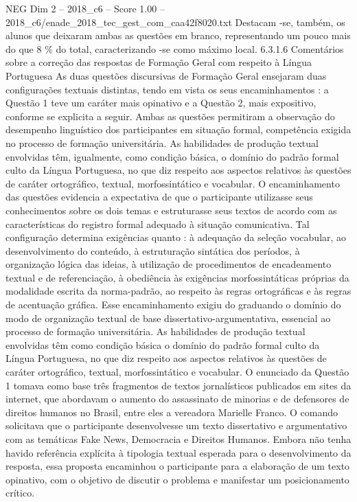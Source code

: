 \begin{textsample}{NEG Dim 2 – 2018\_c6 – Score 1.00 – 2018\_c6/enade\_2018\_tec\_gest\_com\_caa42f8020.txt}
Destacam -se, também, os alunos que deixaram ambas as questões em branco, representando um pouco mais do que 8 \% do total, caracterizando -se como máximo local. 6.3.1.6 Comentários sobre a correção das respostas de Formação Geral com respeito à Língua Portuguesa As duas questões discursivas de Formação Geral ensejaram duas configurações textuais distintas, tendo em vista os seus encaminhamentos : a Questão 1 teve um caráter mais opinativo e a Questão 2, mais expositivo, conforme se explicita a seguir.
Ambas as questões permitiram a observação do desempenho linguístico dos participantes em situação formal, competência exigida no processo de formação universitária.
As habilidades de produção textual envolvidas têm, igualmente, como condição básica, o domínio do padrão formal culto da Língua Portuguesa, no que diz respeito aos aspectos relativos às questões de caráter ortográfico, textual, morfossintático e vocabular.
O encaminhamento das questões evidencia a expectativa de que o participante utilizasse seus conhecimentos sobre os dois temas e estruturasse seus textos de acordo com as características do registro formal adequado à situação comunicativa.
Tal configuração determina exigências quanto : à adequação da seleção vocabular, ao desenvolvimento do conteúdo, à estruturação sintática dos períodos, à organização lógica das ideias, à utilização de procedimentos de encadeamento textual e de referenciação, à obediência às exigências morfossintáticas próprias da modalidade escrita da norma-padrão, ao respeito às regras ortográficas e às regras de acentuação gráfica.
Esse encaminhamento exigiu do graduando o domínio do modo de organização textual de base dissertativo-argumentativa, essencial ao processo de formação universitária.
As habilidades de produção textual envolvidas têm como condição básica o domínio do padrão formal culto da Língua Portuguesa, no que diz respeito aos aspectos relativos às questões de caráter ortográfico, textual, morfossintático e vocabular.
O enunciado da Questão 1 tomava como base três fragmentos de textos jornalísticos publicados em sites da internet, que abordavam o aumento do assassinato de minorias e de defensores de direitos humanos no Brasil, entre eles a vereadora Marielle Franco.
O comando solicitava que o participante desenvolvesse um texto dissertativo e argumentativo com as temáticas Fake News, Democracia e Direitos Humanos.
Embora não tenha havido referência explícita à tipologia textual esperada para o desenvolvimento da resposta, essa proposta encaminhou o participante para a elaboração de um texto opinativo, com o objetivo de discutir o problema e manifestar um posicionamento crítico.

\end{textsample}
